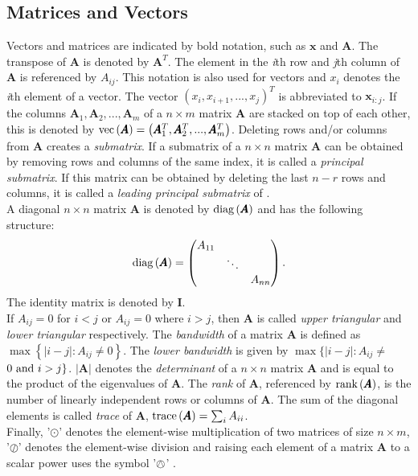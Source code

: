 \subsection{Matrices and Vectors}
Vectors and matrices are indicated by bold notation, such as $\pmb{x}$ and $\pmb{A}$. The transpose of $\pmb{A}$ is denoted by $\pmb{A}^T$. The element in the \textit{i}th row and \textit{j}th column of $\pmb{A}$ is referenced by $A_{ij}$. This notation is also used for vectors and $x_i$ denotes the \textit{i}th element of a vector. The vector $\left(x_i,x_{i+1},...,x_j\right)^T$ is abbreviated to $\pmb{x}_{i:j}$. If the columns $\pmb{A}_1, \pmb{A}_2,...,\pmb{A}_m$ of a $n\times m$ matrix $\pmb{A}$ are stacked on top of each other, this is denoted by $\hbox{vec}\left(\pmb{A}\right)=\left(\pmb{A}_1^T,\pmb{A}_2^T,...,\pmb{A}_m^T\right)$. Deleting rows and/or columns from $\pmb{A}$ creates a \textit{submatrix}. If a submatrix of a $n\times n$ matrix $\pmb{A}$ can be obtained by removing rows and columns of the same index, it is called a \textit{principal submatrix}. If this matrix can be obtained by deleting the last $n-r$ rows and columns, it is called a \textit{leading principal submatrix} of . \\
A diagonal $n\times n$ matrix $\pmb{A}$ is denoted by $\hbox{diag}\left(\pmb{A}\right)$ and has the following structure:
\begin{equation*}
    \hbox{diag}\left(\pmb{A}\right)=\begin{pmatrix}
    A_{11} \\
    & \ddots \\
    &&A_{nn}
    \end{pmatrix}.
\end{equation*}
The identity matrix is denoted by $\pmb{I}$. \\
If $A_{ij}=0$ for $i<j$ or $A_{ij} = 0$ where $i>j$, then $\pmb{A}$ is called \textit{upper triangular} and \textit{lower triangular} respectively. The \textit{bandwidth} of a matrix $\pmb{A}$ is defined as $\max\left\lbrace|i-j|:A_{ij}\neq0\right\rbrace$. The \textit{lower bandwidth} is given by $\max\lbrace|i-j|:A_{ij}\neq $ $0\hbox{ and } i > j\rbrace$. $|\pmb{A}|$ denotes the \textit{determinant} of a $n\times n$ matrix $\pmb{A}$ and is equal to the product of the eigenvalues of $\pmb{A}$. The \textit{rank} of $\pmb{A}$, referenced by $\hbox{rank}\left(\pmb{A}\right)$, is the number of linearly independent rows or columns of $\pmb{A}$. The sum of the diagonal elements is called \textit{trace} of $\pmb{A}$, $\hbox{trace}\left(\pmb{A}\right)=\sum_{i}A_{ii}$.\\
Finally, '$\odot$' denotes the element-wise multiplication of two matrices of size $n\times m$, '$\oslash$' denotes the element-wise division and raising each element of a matrix $\pmb{A}$ to a scalar power uses the symbol '$\owedge$'  \autocite[][14--15]{rue2005gaussian}.
